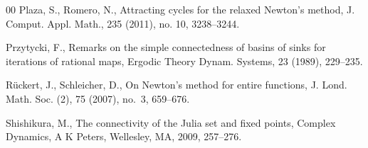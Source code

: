 \documentclass[12pt]{article}
\numberwithin{equation}{section}
\begin{document}
\begin{thebibliography}{00}
	 Plaza, S., Romero, N.,
	Attracting cycles for the relaxed Newton's method, J. Comput. Appl. Math., 235 (2011), no. 10, 3238--3244.
	
		Przytycki, F., Remarks on the simple connectedness of basins of sinks for iterations of rational maps, Ergodic Theory Dynam. Systems, 23 (1989), 229--235.
	
	 R\"uckert, J., Schleicher, D., On Newton's method for entire functions, J. Lond. Math. Soc. (2), { 75} (2007), no.~3, 659--676.
	
	 Shishikura, M., The connectivity of the Julia set and fixed points, Complex Dynamics, A K Peters, Wellesley, MA, 2009, 257--276.
	
\end{thebibliography}
\end{document}
